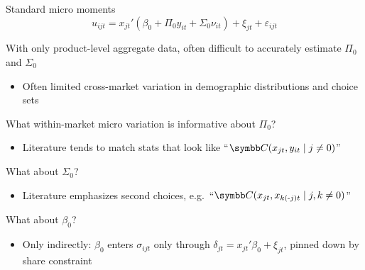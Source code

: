 \documentclass[aspectratio=169,10pt]{beamer}
\begin{document}
\begin{frame}[label=standard]{Standard micro moments}
    \begin{equation*}
        u_{ijt} = x_{jt}'(\beta_0 + \Pi_0 y_{it} + \Sigma_0 \nu_{it}) + \xi_{jt} + \varepsilon_{ijt}
    \end{equation*}
    
    \begin{wideitemize}
        \item With only product-level aggregate data, often difficult to accurately estimate $\Pi_0$ and $\Sigma_0$
        \begin{itemize}
            \item Often limited \alert{cross-market variation} in demographic distributions and choice sets
        \end{itemize}
        
        \item What \alert{within-market} micro variation is informative about $\Pi_0$?
        \begin{itemize}
            \item Literature tends to match stats that look like ``$\Cov(x_{jt}, y_{it} \mid j \neq 0)$''
        \end{itemize}
        
        \item What about $\Sigma_0$?
        \begin{itemize}
            \item Literature emphasizes \alert{second choices}, e.g.\ ``$\Cov(x_{jt}, x_{k(\text{-}j)t} \mid j, k \neq 0)$''
        \end{itemize}
        
        \item What about $\beta_0$?
        \begin{itemize}
            \item Only \alert{indirectly}: $\beta_0$ enters $\sigma_{ijt}$ only through $\delta_{jt} = x_{jt}'\beta_0 + \xi_{jt}$, pinned down by share constraint
        \end{itemize}
    \end{wideitemize}
\end{frame}
\end{document}
